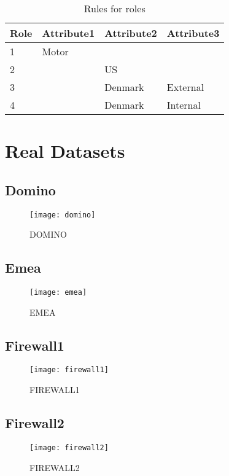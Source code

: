 		\begin{table}[H]
			\centering
			\caption{Rules for roles}
			\label{tab:dataset1_rules}
			\begin{tabular}{|l|l|l|l|}
				\hline
				\rowcolor[HTML]{EFEFEF} 
				Role & Attribute1 & Attribute2 & Attribute3 \\ \hline
				1    & Motor      &            &            \\ \hline
				2    &            & US         &            \\ \hline
				3    &            & Denmark    & External   \\ \hline
				4    &            & Denmark    & Internal   \\ \hline
			\end{tabular}
		\end{table}

\section{Real Datasets}
\label{sec:A_real_datasets}
	\subsection{Domino}
		\begin{figure}[H]
			\centering
			\texttt{[image: domino]}
			\caption{DOMINO}
			\label{fig:domino}
		\end{figure}
	\subsection{Emea}
		\begin{figure}[H]
			\centering
			\texttt{[image: emea]}
			\caption{EMEA}
			\label{fig:emea}
		\end{figure}
	\subsection{Firewall1}
		\begin{figure}[H]
			\centering
			\texttt{[image: firewall1]}
			\caption{FIREWALL1}
			\label{fig:firewall1}
		\end{figure}
	\subsection{Firewall2}
		\begin{figure}[H]
			\centering
			\texttt{[image: firewall2]}
			\caption{FIREWALL2}
			\label{fig:firewall2}
		\end{figure}